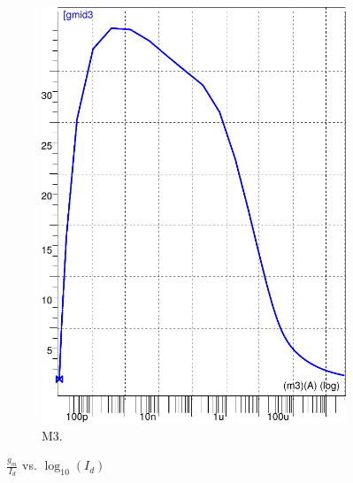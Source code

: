 \begin{figure}[!tbp]
\begin{subfigure}[b]{0.355\textwidth}
   \includegraphics[width=\textwidth]{images/gmid_log10id_m3}
   \caption{M3.}
   \label{fig:f2}
   \end{subfigure}
    \caption{$\frac{g_m}{I_d}$ vs. $\log_{10}(I_d)$}
\end{figure}



